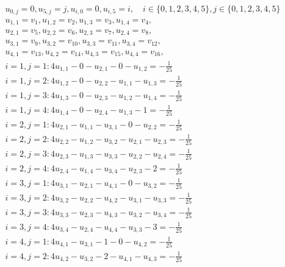 \[\begin{aligned}
u_{0,j}=0,u_{5,j}=j,u_{i,0}=0,u_{i,5}=i,\quad i\in\{0,1,2,3,4,5\},j\in\{0,1,2,3,4,5\}\\
u_{1,1}=v_1,u_{1,2}=v_2,u_{1,3}=v_3,u_{1,4}=v_4,\\
u_{2,1}=v_5,u_{2,2}=v_6,u_{2,3}=v_7,u_{2,4}=v_8,\\
u_{3,1}=v_9,u_{3,2}=v_10,u_{3,3}=v_11,u_{3,4}=v_12,\\
u_{4,1}=v_13,u_{4,2}=v_14,u_{4,3}=v_15,u_{4,4}=v_16,\\
i=1,j=1:4u_{1,1}-0-u_{2,1}-0-u_{1,2}=-\frac{1}{25}\\
i=1,j=2:4u_{1,2}-0-u_{2,2}-u_{1,1}-u_{1,3}=-\frac{1}{25}\\
i=1,j=3:4u_{1,3}-0-u_{2,3}-u_{1,2}-u_{1,4}=-\frac{1}{25}\\
i=1,j=4:4u_{1,4}-0-u_{2,4}-u_{1,3}-1=-\frac{1}{25}\\
i=2,j=1:4u_{2,1}-u_{1,1}-u_{3,1}-0-u_{2,2}=-\frac{1}{25}\\
i=2,j=2:4u_{2,2}-u_{1,2}-u_{3,2}-u_{2,1}-u_{2,3}=-\frac{1}{25}\\
i=2,j=3:4u_{2,3}-u_{1,3}-u_{3,3}-u_{2,2}-u_{2,4}=-\frac{1}{25}\\
i=2,j=4:4u_{2,4}-u_{1,4}-u_{3,4}-u_{2,3}-2=-\frac{1}{25}\\
i=3,j=1:4u_{3,1}-u_{2,1}-u_{4,1}-0-u_{3,2}=-\frac{1}{25}\\
i=3,j=2:4u_{3,2}-u_{2,2}-u_{4,2}-u_{3,1}-u_{3,3}=-\frac{1}{25}\\
i=3,j=3:4u_{3,3}-u_{2,3}-u_{4,3}-u_{3,2}-u_{3,4}=-\frac{1}{25}\\
i=3,j=4:4u_{3,4}-u_{2,4}-u_{4,4}-u_{3,3}-3=-\frac{1}{25}\\
i=4,j=1:4u_{4,1}-u_{3,1}-1-0-u_{4,2}=-\frac{1}{25}\\
i=4,j=2:4u_{4,2}-u_{3,2}-2-u_{4,1}-u_{4,3}=-\frac{1}{25}\\

\end{aligned}\]

